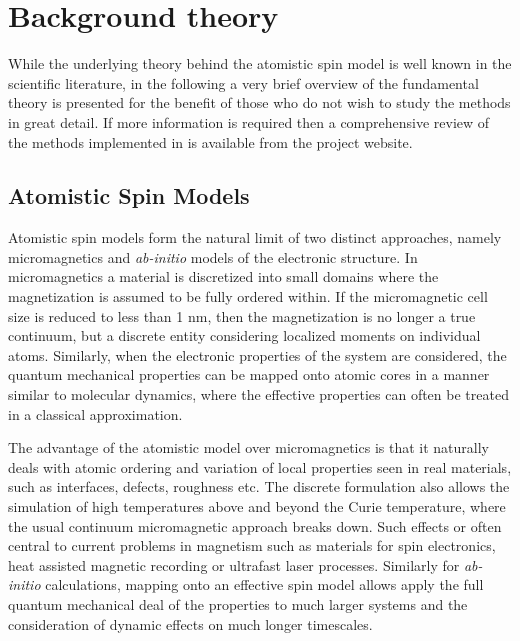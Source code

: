 \chapter{Background theory}\label{chap:theory}
While the underlying theory behind the atomistic spin model is well known in the scientific literature, in the following a very brief overview of the fundamental theory is presented for the benefit of those who do not wish to study the methods in great detail. If more information is required then a comprehensive review of the methods implemented in \vampire is available from the project website.

\section*{Atomistic Spin Models}
Atomistic spin models form the natural limit of two distinct approaches, namely micromagnetics and \textit{ab-initio} models of the electronic structure. In micromagnetics a material is discretized into small domains where the magnetization is assumed to be fully ordered within. If the micromagnetic cell size is reduced to less than 1 nm, then the magnetization is no longer a true continuum, but a discrete entity considering localized moments on individual atoms. Similarly, when the electronic properties of the system are considered, the quantum mechanical properties can be mapped onto atomic cores in a manner similar to molecular dynamics, where the effective properties can often be treated in a classical approximation.

The advantage of the atomistic model over micromagnetics is that it naturally deals with atomic ordering and variation of local properties seen in real materials, such as interfaces, defects, roughness etc. The discrete formulation also allows the simulation of high temperatures above and beyond the Curie temperature, where the usual continuum micromagnetic approach breaks down. Such effects or often central to current problems in magnetism such as materials for spin electronics, heat assisted magnetic recording or ultrafast laser processes. Similarly for \textit{ab-initio} calculations, mapping onto an effective spin model allows apply the full quantum mechanical deal of the properties to much larger systems and the consideration of dynamic effects on much longer timescales.

